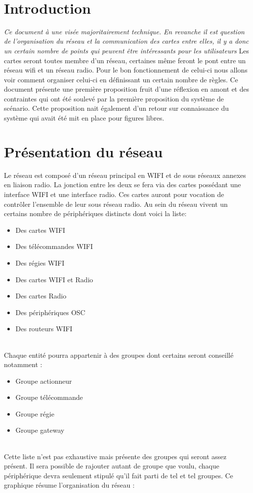 \newpage
~ \thispagestyle{empty}

\tableofcontents

\newpage

\setcounter{page}{1}

\section{Introduction}
\textit{Ce document à une visée majoritairement technique. En revanche il est question de l'organisation du réseau et la communication des cartes entre elles, il y a donc un certain nombre de points qui peuvent être intéressants pour les utilisateurs}\p
Les cartes seront toutes membre d'un réseau, certaines même feront le pont entre un réseau wifi et un réseau radio. Pour le bon fonctionnement de celui-ci nous allons voir comment organiser celui-ci en définissant un certain nombre de règles.\p
Ce document présente une première proposition fruit d'une réflexion en amont et des contraintes qui ont été soulevé par la première proposition du système de scénario. Cette proposition nait également d'un retour sur connaissance du système qui avait été mit en place pour figures libres.

\section{Présentation du réseau}
Le réseau est composé d'un réseau principal en WIFI et de sous réseaux annexes en liaison radio. La jonction entre les deux se fera via des cartes possédant une interface WIFI et une interface radio. Ces cartes auront pour vocation de contrôler l'ensemble de leur sous réseau radio.\p
Au sein du réseau vivent un certains nombre de périphériques distincts dont voici la liste: 
\begin{itemize}
\item Des cartes WIFI
\item Des télécommandes WIFI
\item Des régies WIFI
\item Des cartes WIFI et Radio
\item Des cartes Radio
\item Des périphériques OSC
\item Des routeurs WIFI
\end{itemize}~\\
\indent Chaque entité pourra appartenir à des groupes dont certains seront conseillé notamment :
\begin{itemize}
\item Groupe actionneur
\item Groupe télécommande
\item Groupe régie
\item Groupe gateway
\end{itemize}~\\ \indent
Cette liste n'est pas exhaustive mais présente des groupes qui seront assez présent. Il sera possible de rajouter autant de groupe que voulu, chaque périphérique devra seulement stipulé qu'il fait parti de tel et tel groupes.\p
Ce graphique résume l'organisation du réseau :

